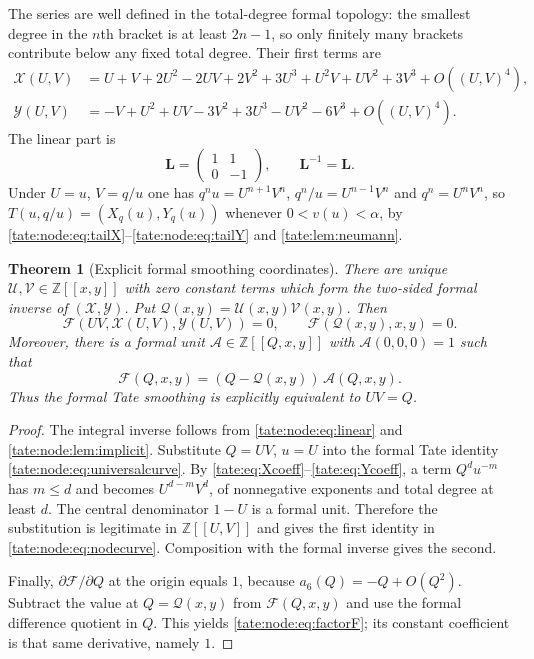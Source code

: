 \documentclass[11pt,letterpaper]{article}
\newtheorem{theorem}{Theorem}[section]
\theoremstyle{definition}
\newcommand{\Z}{\mathbb Z}
\newcommand{\X}{\mathcal X}
\newcommand{\Y}{\mathcal Y}
\newcommand{\UU}{\mathcal U}
\newcommand{\VV}{\mathcal V}
\newcommand{\QQ}{\mathcal Q}
\newcommand{\Fp}{\mathcal F}
\newcommand{\bL}{\mathbf L}
\begin{document}
The series are well defined in the total-degree formal topology: the
smallest degree in the $n$th bracket is at least $2n-1$, so only finitely
many brackets contribute below any fixed total degree. Their first terms are
\begin{align}
 \X(U,V)&=U+V+2U^2-2UV+2V^2
 +3U^3+U^2V+UV^2+3V^3+O((U,V)^4),\label{tate:node:eq:Xsmall}\\
 \Y(U,V)&=-V+U^2+UV-3V^2
       +3U^3-UV^2-6V^3+O((U,V)^4).\label{tate:node:eq:Ysmall}
\end{align}
The linear part is
\begin{equation}
 \bL=\begin{pmatrix}1&1\\0&-1\end{pmatrix},\qquad \bL^{-1}=\bL.
 \label{tate:node:eq:linear}
\end{equation}
Under $U=u$, $V=q/u$ one has $q^nu=U^{n+1}V^n$, $q^n/u=U^{n-1}V^n$ and
$q^n=U^nV^n$, so $T(u,q/u)=(X_q(u),Y_q(u))$ whenever $0<v(u)<\alpha$, by
\eqref{tate:node:eq:tailX}--\eqref{tate:node:eq:tailY} and
\cref{tate:lem:neumann}.

\begin{theorem}[Explicit formal smoothing coordinates]\label{tate:node:thm:node}
There are unique $\UU,\VV\in\Z[[x,y]]$ with zero constant terms which form
the two-sided formal inverse of $(\X,\Y)$. Put $\QQ(x,y)=\UU(x,y)\VV(x,y)$.
Then
\begin{equation}
 \Fp(UV,\X(U,V),\Y(U,V))=0,
 \qquad \Fp(\QQ(x,y),x,y)=0.\label{tate:node:eq:nodecurve}
\end{equation}
Moreover, there is a formal unit $\mathcal A\in\Z[[Q,x,y]]$ with
$\mathcal A(0,0,0)=1$ such that
\begin{equation}
 \Fp(Q,x,y)=(Q-\QQ(x,y))\,\mathcal A(Q,x,y).\label{tate:node:eq:factorF}
\end{equation}
Thus the formal Tate smoothing is explicitly equivalent to $UV=Q$.
\end{theorem}

\begin{proof}
The integral inverse follows from \eqref{tate:node:eq:linear} and
\cref{tate:node:lem:implicit}. Substitute $Q=UV$, $u=U$ into the formal
Tate identity \eqref{tate:node:eq:universalcurve}. By
\eqref{tate:eq:Xcoeff}--\eqref{tate:eq:Ycoeff}, a term $Q^du^{-m}$ has
$m\le d$ and becomes $U^{d-m}V^d$, of nonnegative exponents and total degree
at least $d$. The central denominator $1-U$ is a formal unit. Therefore the
substitution is legitimate in $\Z[[U,V]]$ and gives the first identity in
\eqref{tate:node:eq:nodecurve}. Composition with the formal inverse gives
the second.

Finally, $\partial\Fp/\partial Q$ at the origin equals $1$, because
$a_6(Q)=-Q+O(Q^2)$. Subtract the value at $Q=\QQ(x,y)$ from $\Fp(Q,x,y)$ and
use the formal difference quotient in $Q$. This yields
\eqref{tate:node:eq:factorF}; its constant coefficient is that same
derivative, namely $1$.
\end{proof}
\end{document}
